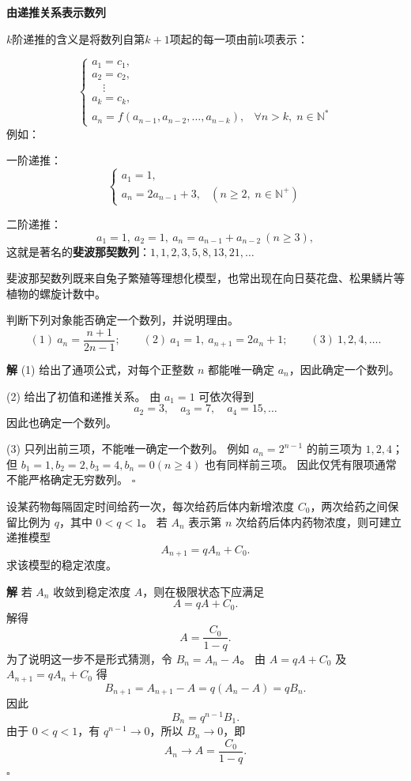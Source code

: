 \documentclass[fontset=fandol]{ctexart}
\newenvironment{custom}[1]{\par\noindent\textbf{#1}\quad}{\par\vspace{0.8em}}
\newenvironment{solution}{\par\noindent\textbf{解}\quad}{\hfill$\square$\par\vspace{0.8em}}
\begin{document}
\begin{custom}{由递推关系表示数列}
	
	$k$阶递推的含义是将数列自第$k+1$项起的每一项由前k项表示：
	
	\begin{equation*}
		\begin{cases}
			a_1 = c_1, \\
			a_2 = c_2, \\
			\quad \vdots \\
			a_k = c_k, \\
			a_n = f(a_{n-1}, a_{n-2}, \dots, a_{n-k}), & \forall n > k, \; n \in \mathbb{N}^*
		\end{cases}
	\end{equation*}
	例如：
	
	一阶递推：
	\begin{equation*}
		\begin{cases}
			a_1 = 1, \\
			a_n = 2 a_{n-1} + 3, & (n \ge 2, \; n \in \mathbb{N}^+)
		\end{cases}
	\end{equation*}
	
	二阶递推：
	\[
	a_1 = 1,\ a_2 = 1,\ a_n = a_{n-1} + a_{n-2}\ (n \geq 3),
	\]
	这就是著名的\textbf{斐波那契数列}：\(1,1,2,3,5,8,13,21,\dots\)
	
	斐波那契数列既来自兔子繁殖等理想化模型，也常出现在向日葵花盘、松果鳞片等植物的螺旋计数中。
\end{custom}

\begin{example}
判断下列对象能否确定一个数列，并说明理由。
\[
(1)\ a_n=\frac{n+1}{2n-1};\qquad
(2)\ a_1=1,\ a_{n+1}=2a_n+1;\qquad
(3)\ 1,2,4,\ldots .
\]
\end{example}
\begin{solution}
(1) 给出了通项公式，对每个正整数 $n$ 都能唯一确定 $a_n$，因此确定一个数列。

(2) 给出了初值和递推关系。 由 $a_1=1$ 可依次得到
\[
a_2=3,\quad a_3=7,\quad a_4=15,\ldots
\]
因此也确定一个数列。

(3) 只列出前三项，不能唯一确定一个数列。 例如 $a_n=2^{n-1}$ 的前三项为 $1,2,4$；但 $b_1=1,b_2=2,b_3=4,b_n=0(n\ge4)$ 也有同样前三项。 因此仅凭有限项通常不能严格确定无穷数列。
\end{solution}

\begin{example}
设某药物每隔固定时间给药一次，每次给药后体内新增浓度 $C_0$，两次给药之间保留比例为 $q$，其中 $0<q<1$。 若 $A_n$ 表示第 $n$ 次给药后体内药物浓度，则可建立递推模型
\[
A_{n+1}=qA_n+C_0.
\]
求该模型的稳定浓度。
\end{example}
\begin{solution}
若 $A_n$ 收敛到稳定浓度 $A$，则在极限状态下应满足
\[
A=qA+C_0.
\]
解得
\[
A=\frac{C_0}{1-q}.
\]
为了说明这一步不是形式猜测，令 $B_n=A_n-A$。 由 $A=qA+C_0$ 及 $A_{n+1}=qA_n+C_0$ 得
\[
B_{n+1}=A_{n+1}-A=q(A_n-A)=qB_n.
\]
因此
\[
B_n=q^{n-1}B_1.
\]
由于 $0<q<1$，有 $q^{n-1}\to0$，所以 $B_n\to0$，即
\[
A_n\to A=\frac{C_0}{1-q}.
\]
\end{solution}
\end{document}
